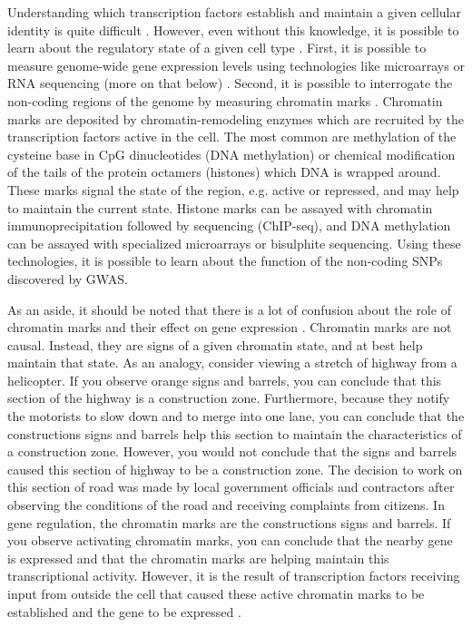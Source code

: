 Understanding which transcription factors establish and maintain a
given cellular identity is quite difficult \citep{Vaquerizas2009, Biggin2011, Zaret2016}. However, even without this
knowledge, it is possible to learn about the regulatory state of a
given cell type \citep{Ho2014}. First, it is possible to measure genome-wide gene
expression levels using technologies like microarrays or RNA
sequencing (more on that below) \citep{Wang2009, Oshlack2010}. Second, it is possible to interrogate
the non-coding regions of the genome by measuring chromatin
marks \citep{Park2009, Landt2012}. Chromatin marks are deposited by chromatin-remodeling enzymes
which are recruited by the transcription factors active in the
cell. The most common are methylation of the cysteine base in CpG
dinucleotides (DNA methylation) or chemical modification of the tails
of the protein octamers (histones) which DNA is wrapped around. These
marks signal the state of the region, e.g. active or repressed, and may
help to maintain the current state. Histone marks can be assayed with
chromatin immunoprecipitation followed by sequencing (ChIP-seq), and
DNA methylation can be assayed with specialized microarrays or
bisulphite sequencing. Using these technologies, it is possible to
learn about the function of the non-coding SNPs discovered by GWAS.

As an aside, it should be noted that there is a lot of confusion about
the role of chromatin marks and their effect on gene
expression \citep{Henikoff2011}. Chromatin marks are not causal. Instead, they are signs of
a given chromatin state, and at best help maintain that state. As an
analogy, consider viewing a stretch of highway from a helicopter. If
you observe orange signs and barrels, you can conclude that this
section of the highway is a construction zone. Furthermore, because
they notify the motorists to slow down and to merge into one lane, you
can conclude that the constructions signs and barrels help this
section to maintain the characteristics of a construction
zone. However, you would not conclude that the signs and barrels
caused this section of highway to be a construction zone. The decision
to work on this section of road was made by local government officials
and contractors after observing the conditions of the road and
receiving complaints from citizens. In gene regulation, the chromatin
marks are the constructions signs and barrels. If you observe
activating chromatin marks, you can conclude that the nearby gene is
expressed and that the chromatin marks are helping maintain this
transcriptional activity. However, it is the result of transcription
factors receiving input from outside the cell that caused these active
chromatin marks to be established and the gene to be expressed \citep{Natoli2010}.


